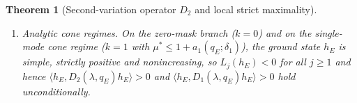 \documentclass[11pt]{article}
\newcommand{\Fcal}{\mathcal F}
\newcommand{\muS}{\mu^{*}}
\newtheorem{theorem}{Theorem}[section]
\theoremstyle{definition}
\theoremstyle{remark}
\begin{document}
\begin{theorem}[Second-variation operator $D_2$ and local strict maximality]
\begin{enumerate}[label=(\roman*),leftmargin=2.2em]
hypothesis~(2), conditions~(1) and~(3) still guarantee
$\langle h_E,D_2(\lambda,q_E)h_E\rangle>0$ and $\langle h_E,D_1(\lambda,q_E)h_E\rangle>0$
for every $0\ne h_E\in\ker\Fcal_{\delta_1}^{(k)}(q_E)$, together with strict positivity
$\Fcal_p^{(k)}(q)\succ0$ on a two-sided neighbourhood $(q_E-\eta_2,q_E+\eta_1]$ for all
$p\in\mathcal P_1\setminus\{\delta_1\}$ supported in $[1-\delta_0,1+\delta_0]$.) If in
addition $\ker\Fcal_{\delta_1}^{(k)}(q_E)=\operatorname{span}\{h_E\}$ is simple
($\|h_E\|_2=1$), the onset shift of a family $p_\varepsilon$ supported in
$[1-\delta(\varepsilon),1+\delta(\varepsilon)]$ ($\delta(\varepsilon)\to0$) satisfies
\begin{equation}\label{eq:d2shift}
q_{\rm lin}(\lambda,\muS,R;p_\varepsilon)=q_E-\varepsilon^2\sigma^2\,q_E
\frac{\langle h_E,D_2(\lambda,q_E)h_E\rangle}{\langle h_E,D_1(\lambda,q_E)h_E\rangle}
+o(\varepsilon^2)<q_E.
\end{equation}
\item \emph{Analytic cone regimes.} On the zero-mask branch ($k=0$) and on the single-mode
cone regime ($k=1$ with $\muS\le1+a_1(q_E;\delta_1)$), the ground state $h_E$ is simple,
strictly positive and nonincreasing, so $L_j(h_E)<0$ for all $j\ge1$ and hence
$\langle h_E,D_2(\lambda,q_E)h_E\rangle>0$ and $\langle h_E,D_1(\lambda,q_E)h_E\rangle>0$
hold unconditionally.
\end{enumerate}
\end{theorem}
\end{document}
